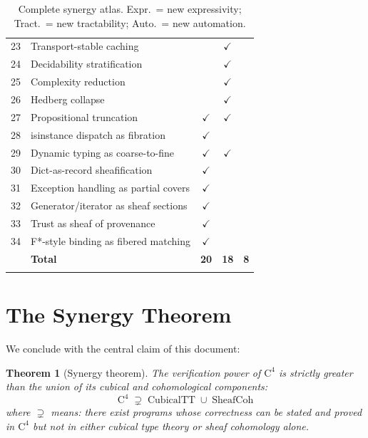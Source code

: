\documentclass[11pt,a4paper]{article}
\theoremstyle{definition}
\theoremstyle{plain}
\newtheorem{theorem}[definition]{Theorem}
\begin{document}
\begin{longtable}{clccc}
23 & Transport-stable caching & & $\checkmark$ & \\
24 & Decidability stratification & & $\checkmark$ & \\
25 & Complexity reduction & & $\checkmark$ & \\
26 & Hedberg collapse & & $\checkmark$ & \\
27 & Propositional truncation & $\checkmark$ & $\checkmark$ & \\
28 & isinstance dispatch as fibration & $\checkmark$ & & \\
29 & Dynamic typing as coarse-to-fine & $\checkmark$ & $\checkmark$ & \\
30 & Dict-as-record sheafification & $\checkmark$ & & \\
31 & Exception handling as partial covers & $\checkmark$ & & \\
32 & Generator/iterator as sheaf sections & $\checkmark$ & & \\
33 & Trust as sheaf of provenance & $\checkmark$ & & \\
34 & F*-style binding as fibered matching & $\checkmark$ & & \\
\midrule
   & \textbf{Total} & \textbf{20} & \textbf{18} & \textbf{8} \\
\bottomrule
\caption{Complete synergy atlas.
  Expr.\ = new expressivity; Tract.\ = new tractability;
  Auto.\ = new automation.}
\label{tab:synergy-atlas}
\end{longtable}


\section{The Synergy Theorem}
\label{sec:syn-theorem}

We conclude with the central claim of this document:

\begin{theorem}[Synergy theorem]
\label{thm:synergy}
The verification power of $\mathrm{C}^4$ is strictly greater than
the union of its cubical and cohomological components:
\[
  \mathrm{C}^4 \;\supsetneq\;
  \mathrm{CubicalTT} \;\cup\; \mathrm{SheafCoh}
\]
where $\supsetneq$ means: there exist programs whose correctness
can be stated and proved in $\mathrm{C}^4$ but not in either
cubical type theory or sheaf cohomology alone.
\end{theorem}
\end{document}
